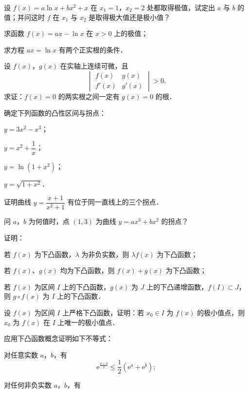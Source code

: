 \begin{xiti}
\item 设 $f(x) = a\ln x + bx^2 + x$ 在 $x_1 = 1$，$x_2 = 2$ 处都取得极值，试定出 $a$ 与 $b$ 的值；并问这时 $f$ 在 $x_1$ 与 $x_2$ 是取得极大值还是极小值？
\item
\begin{ziti}
\item 求函数 $f(x) = ax - \ln x$ 在 $x > 0$ 上的极值；
\item 求方程 $ax = \ln x$ 有两个正实根的条件．
\end{ziti}
\item 设 $f(x)$，$g(x)$ 在实轴上连续可微，且
\[
\begin{vmatrix} f(x) & g(x) \\ f'(x) & g'(x) \end{vmatrix} > 0.
\]
求证：$f(x) = 0$ 的两实根之间一定有 $g(x) = 0$ 的根．
\item 确定下列函数的凸性区间与拐点：
\begin{ziti}
\item $y = 3x^2 - x^3$；
\item $y = x^2 + \dfrac{1}{x}$；
\item $y = \ln(1+x^2)$；
\item $y = \sqrt{1+x^2}$．
\end{ziti}
\item 证明曲线 $y = \dfrac{x+1}{x^2+1}$ 有位于同一直线上的三个拐点．
\item 问 $a$，$b$ 为何值时，点 $(1,3)$ 为曲线 $y = ax^3 + bx^2$ 的拐点？
\item 证明：
\begin{ziti}
\item 若 $f(x)$ 为下凸函数，$\lambda$ 为非负实数，则 $\lambda f(x)$ 为下凸函数；
\item 若 $f(x)$、$g(x)$ 均为下凸函数，则 $f(x) + g(x)$ 为下凸函数；
\item 若 $f(x)$ 为区间 $I$ 上的下凸函数，$g(x)$ 为 $J$ 上的下凸递增函数，$f(I) \subset J$，则 $g\circ f(x)$ 为 $I$ 上的下凸函数．
\end{ziti}
\item 设 $f(x)$ 为区间 $I$ 上严格下凸函数，证明：若 $x_0 \in I$ 为 $f(x)$ 的极小值点，则 $x_0$ 为 $f(x)$ 在 $I$ 上唯一的极小值点．
\item 应用下凸函数概念证明如下不等式：
\begin{ziti}
\item 对任意实数 $a$，$b$，有
\[
\mathrm{e}^{\frac{a+b}{2}} \leqslant \frac{1}{2}\left(\mathrm{e}^a + \mathrm{e}^b\right);
\]
\item 对任何非负实数 $a$，$b$，有

\end{ziti}
\end{xiti}

